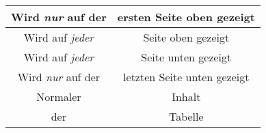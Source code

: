 \begin{longtable}{c|c}
  Wird \emph{nur} auf der & ersten Seite oben gezeigt \\
  \endfirsthead
  Wird auf \emph{jeder}   & Seite oben gezeigt \\
  \endhead
  Wird auf \emph{jeder}   & Seite unten gezeigt \\
  \endfoot
  Wird \emph{nur} auf der & letzten Seite unten gezeigt \\
  \endlastfoot
  Normaler                & Inhalt \\
  der                     & Tabelle \\
\end{longtable}
